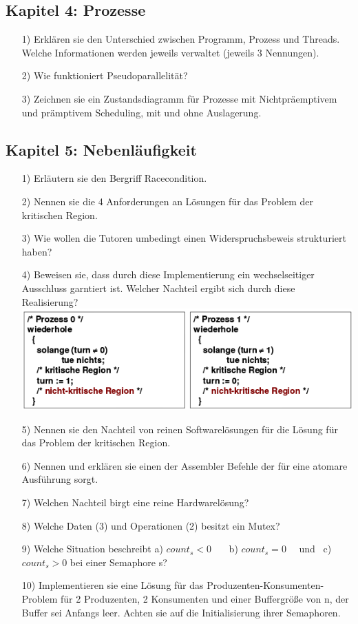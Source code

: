\documentclass[11pt,a4paper]{article}
\begin{document}
\subsection*{Kapitel 4: Prozesse}
\begin{itemize}
\item[1)] Erklären sie den Unterschied zwischen Programm, Prozess und Threads. Welche Informationen werden jeweils verwaltet (jeweils 3 Nennungen).
\item[2)] Wie funktioniert Pseudoparallelität?
\item[3)] Zeichnen sie ein Zustandsdiagramm für Prozesse mit Nichtpräemptivem und prämptivem Scheduling, mit und ohne Auslagerung.
\end{itemize}


\pagebreak


\subsection*{Kapitel 5: Nebenläufigkeit}
\begin{itemize}
\item[1)] Erläutern sie den Bergriff \glqq Racecondition\grqq.
\item[2)] Nennen sie die 4 Anforderungen an Lösungen für das Problem der kritischen Region.
\item[3)] Wie wollen die Tutoren umbedingt einen Widerspruchsbeweis strukturiert haben?
\item[4)] Beweisen sie, dass durch diese Implementierung ein wechselseitiger Ausschluss garntiert ist. Welcher Nachteil ergibt sich durch diese Realisierung?\\
\includegraphics[scale=0.7]{kap5strikt.png}
\item[5)] Nennen sie den Nachteil von reinen Softwarelösungen für die Lösung für das Problem der kritischen Region.
\item[6)] Nennen und erklären sie einen der Assembler Befehle der für eine atomare Ausführung sorgt.
\item[7)] Welchen Nachteil birgt eine reine Hardwarelösung?
\item[8)] Welche Daten (3) und Operationen (2) besitzt ein Mutex?
\item[9)] Welche Situation beschreibt a) \texttt{$count_s < 0$} \ \ \ b) \texttt{$count_s = 0$} \ \ und \ c)  \texttt{$count_s > 0$} bei einer Semaphore s?
\item[10)] Implementieren sie eine Lösung für das Produzenten-Konsumenten-Problem für 2 Produzenten, 2 Konsumenten und einer Buffergröße von n, der Buffer sei Anfangs leer. Achten sie auf die Initialisierung ihrer Semaphoren.
\end{itemize}
\end{document}
